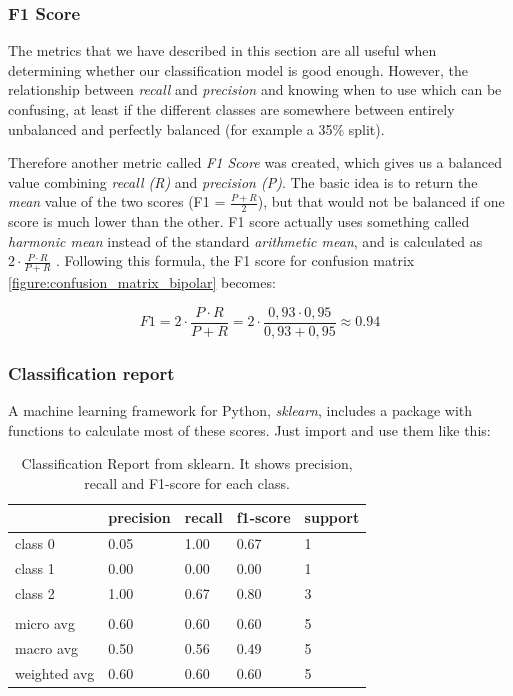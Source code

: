 \subsubsection{F1 Score}

The metrics that we have described in this section are all useful when determining whether our classification model is good enough. However, the relationship between \textit{recall} and \textit{precision} and knowing when to use which can be confusing, at least if the different classes are somewhere between entirely unbalanced and perfectly balanced (for example a 35\% split). 

Therefore another metric called \textit{F1 Score} was created, which gives us a balanced value combining \textit{recall (R)} and \textit{precision (P)}. The basic idea is to return the \textit{mean} value of the two scores (F1 = $ \frac{P + R}{2} $), but that would not be balanced if one score is much lower than the other. F1 score actually uses something called \textit{harmonic mean} instead of the standard \textit{arithmetic mean}, and is calculated as $ 2 \cdot \frac{P \cdot R}{P + R} $ \cite{ml_metrics}. 
Following this formula, the F1 score for confusion matrix \ref{figure:confusion_matrix_bipolar} becomes:

\[
  F1 = 2 \cdot \frac{P \cdot R}{P + R} = 2 \cdot \frac{0,93 \cdot 0,95}{0,93 + 0,95} \approx 0.94
\]

\subsubsection{Classification report}

A machine learning framework for Python, \textit{sklearn}, includes a package with functions to calculate most of these scores. Just import and use them like this: 



\begin{table}[h]
\begin{center}
  \begin{tabular}{| l | l | l | l | l |}
    \hline
                  & precision & recall  & f1-score & support \\ \hline
    class 0       & 0.05      & 1.00    & 0.67     & 1       \\
    class 1       & 0.00      & 0.00    & 0.00     & 1       \\
    class 2       & 1.00      & 0.67    & 0.80     & 3       \\
                  &           &         &          &         \\ 
    micro avg     & 0.60      & 0.60    & 0.60     & 5       \\
    macro avg     & 0.50      & 0.56    & 0.49     & 5       \\
    weighted avg  & 0.60      & 0.60    & 0.60     & 5       \\
    \hline
  \end{tabular}
  \caption{Classification Report from sklearn. It shows precision, recall and F1-score for each class.}
  \label{table:classification_report}
\end{center}
\end{table}

